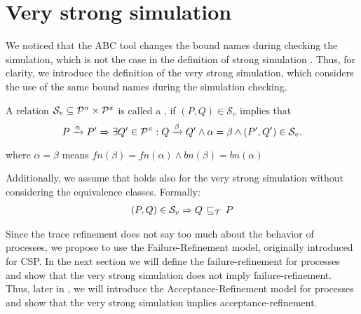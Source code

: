 \section{Very strong simulation}
\label{sec_failure-refinement}
We noticed that the ABC tool changes the bound names during checking the simulation, which is not the case in the definition of strong simulation . Thus, for clarity, we introduce the definition of the very strong simulation, which considers the use of the same bound names during the simulation checking.

\begin{definition}
\label{def_strong_sim}
A relation $\mathcal{S}_v\subseteq\mathcal P^{\pi}\times\mathcal P^{\pi}$ is called a , if $(P,Q)\in\mathcal{S}_v$ implies that
\[P \xrightarrow{\alpha} P' \Rightarrow \exists Q'\in\mathcal P^{\pi}: Q \xrightarrow{\beta} Q' \wedge \alpha = \beta \wedge (P',Q')\in\mathcal{S}_v.\]
\end{definition}
where $\alpha = \beta$ means $fn(\beta)=fn(\alpha)\wedge bn(\beta)=bn(\alpha)$

Additionally, we assume that  holds also for the very strong simulation without considering the equivalence classes. Formally:
\begin{align}
    (P,Q)\in{}\simuv \Rightarrow Q \refi P
\label{property2}
\end{align}

Since the trace refinement does not say too much about the behavior of processes, we propose to use the Failure-Refinement model, originally introduced for CSP. In the next section we will define the failure-refinement for \picalc{} processes and show that the very strong simulation does not imply failure-refinement. Thus, later in , we will introduce the Acceptance-Refinement model for \picalc{} processes and show that the very strong simulation implies acceptance-refinement.